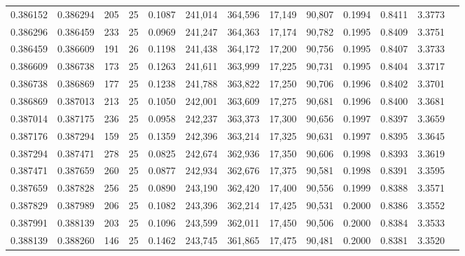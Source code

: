 \begin{tabular}{rrrrrrrrrrrrr}
0.386152 & 0.386294 &   205 &  25 &                                     0.1087 & 241,014 & 364,596 &  17,149 &  90,807 & 0.1994 & 0.8411 & 3.3773 \\
0.386296 & 0.386459 &   233 &  25 &                                     0.0969 & 241,247 & 364,363 &  17,174 &  90,782 & 0.1995 & 0.8409 & 3.3751 \\
0.386459 & 0.386609 &   191 &  26 &                                     0.1198 & 241,438 & 364,172 &  17,200 &  90,756 & 0.1995 & 0.8407 & 3.3733 \\
0.386609 & 0.386738 &   173 &  25 &                                     0.1263 & 241,611 & 363,999 &  17,225 &  90,731 & 0.1995 & 0.8404 & 3.3717 \\
0.386738 & 0.386869 &   177 &  25 &                                     0.1238 & 241,788 & 363,822 &  17,250 &  90,706 & 0.1996 & 0.8402 & 3.3701 \\
0.386869 & 0.387013 &   213 &  25 &                                     0.1050 & 242,001 & 363,609 &  17,275 &  90,681 & 0.1996 & 0.8400 & 3.3681 \\
0.387014 & 0.387175 &   236 &  25 &                                     0.0958 & 242,237 & 363,373 &  17,300 &  90,656 & 0.1997 & 0.8397 & 3.3659 \\
0.387176 & 0.387294 &   159 &  25 &                                     0.1359 & 242,396 & 363,214 &  17,325 &  90,631 & 0.1997 & 0.8395 & 3.3645 \\
0.387294 & 0.387471 &   278 &  25 &                                     0.0825 & 242,674 & 362,936 &  17,350 &  90,606 & 0.1998 & 0.8393 & 3.3619 \\
0.387471 & 0.387659 &   260 &  25 &                                     0.0877 & 242,934 & 362,676 &  17,375 &  90,581 & 0.1998 & 0.8391 & 3.3595 \\
0.387659 & 0.387828 &   256 &  25 &                                     0.0890 & 243,190 & 362,420 &  17,400 &  90,556 & 0.1999 & 0.8388 & 3.3571 \\
0.387829 & 0.387989 &   206 &  25 &                                     0.1082 & 243,396 & 362,214 &  17,425 &  90,531 & 0.2000 & 0.8386 & 3.3552 \\
0.387991 & 0.388139 &   203 &  25 &                                     0.1096 & 243,599 & 362,011 &  17,450 &  90,506 & 0.2000 & 0.8384 & 3.3533 \\
0.388139 & 0.388260 &   146 &  25 &                                     0.1462 & 243,745 & 361,865 &  17,475 &  90,481 & 0.2000 & 0.8381 & 3.3520 \\

\end{tabular}
